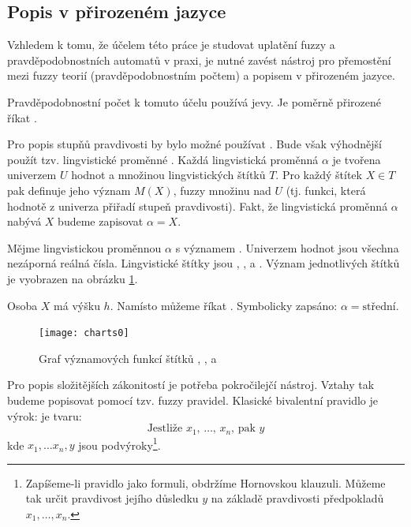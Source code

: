 \documentclass[a4paper,10pt]{article}
\begin{document}
\subsection{Popis v přirozeném jazyce}
Vzhledem k tomu, že účelem této práce je studovat uplatění fuzzy a pravděpodobnostních automatů v praxi, je nutné zavést nástroj pro přemostění  mezi fuzzy teorií (pravděpodobnostním počtem) a popisem v přirozeném jazyce.

Pravděpodobnostní počet k tomuto účelu používá jevy. Je poměrně přirozené říkat .

Pro popis stupňů pravdivosti by bylo možné používat . Bude však výhodnější použít tzv. lingvistické proměnné \cite{Zad-ConLingVarAppApprRea}. Každá lingvistická proměnná $\alpha$ je tvořena univerzem $U$ hodnot a množinou lingvistických štítků $T$. Pro každý štítek $X \in T$ pak definuje jeho význam $M(X)$, fuzzy množinu nad $U$ (tj. funkci, která hodnotě z univerza přiřadí stupeň pravdivosti). Fakt, že lingvistická proměnná $\alpha$ nabývá  $X$ budeme zapisovat $\alpha = X$.

\begin{example}
 Mějme lingvistickou proměnnou $\alpha$ s významem . Univerzem hodnot jsou všechna nezáporná reálná čísla. Lingvistické štítky jsou , ,  a . Význam jednotlivých štítků je vyobrazen na obrázku \ref{fig:lingVarsMeansChart}.

 Osoba $X$ má výšku $h$. Namísto  můžeme říkat . Symbolicky zapsáno: $\alpha = \text{střední}$.
\end{example}

\begin{figure}
 \centering
 \texttt{[image: charts0]}
 
 \caption{Graf významových funkcí štítků , ,  a } \label{fig:lingVarsMeansChart}
\end{figure}

Pro popis složitějších zákonitostí je potřeba pokročilejčí nástroj. Vztahy tak budeme popisovat pomocí tzv. fuzzy \ifthen pravidel. Klasické bivalentní \ifthen pravidlo je výrok: je tvaru:
$$
 \text{Jestliže $x_1$, $\dots$, $x_n$, pak $y$}
$$
kde $x_1, \dots x_n, y$ jsou podvýroky\footnote{Zapíšeme-li \ifthen pravidlo jako formuli, obdržíme Hornovskou klauzuli. Můžeme tak určit pravdivost jejího důsledku $y$ na základě pravdivosti předpokladů $x_1, \dots, x_n$.}.
\end{document}
